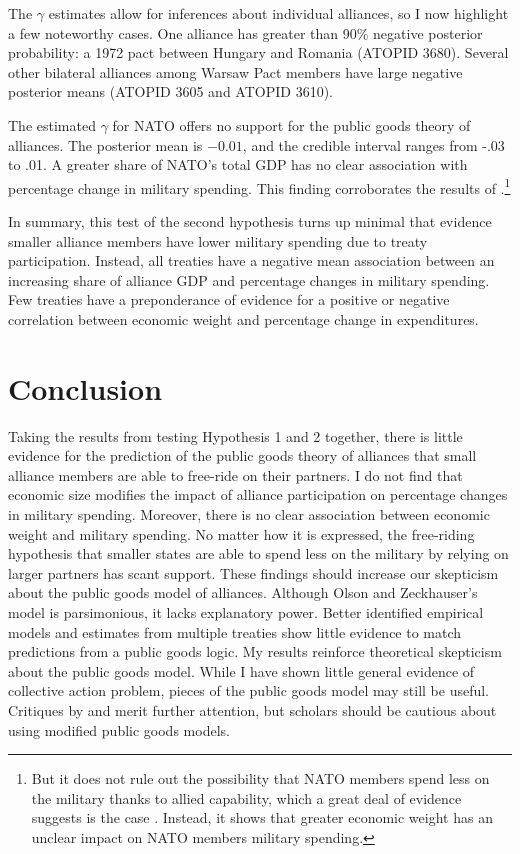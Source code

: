 \documentclass[12pt]{article}
\begin{document}
The $\gamma$ estimates allow for inferences about individual alliances, so I now highlight a few noteworthy cases. 
One alliance has greater than 90\% negative posterior probability: a 1972 pact between Hungary and Romania (ATOPID 3680). 
Several other bilateral alliances among Warsaw Pact members have large negative posterior means (ATOPID 3605 and ATOPID 3610). 

 
The estimated $\gamma$ for NATO offers no support for the public goods theory of alliances. 
The posterior mean is $-0.01$, and the credible interval ranges from -.03 to .01.  
A greater share of NATO's total GDP has no clear association with percentage change in military spending. 
This finding corroborates the results of \citet{PluemperNeumayer2015}.\footnote{But it does not rule out the possibility that NATO members spend less on the military thanks to allied capability, which a great deal of evidence suggests is the case \citep{GeorgeSandler2017}. Instead, it shows that greater economic weight has an unclear impact on NATO members military spending.}


In summary, this test of the second hypothesis turns up minimal that evidence smaller alliance members have lower military spending due to treaty participation. 
Instead, all treaties have a negative mean association between an increasing share of alliance GDP and percentage changes in military spending. 
Few treaties have a preponderance of evidence for a positive or negative correlation between economic weight and percentage change in expenditures.   


\section{Conclusion}

Taking the results from testing Hypothesis 1 and 2 together, there is little evidence for the prediction of the public goods theory of alliances that small alliance members are able to free-ride on their partners. 
I do not find that economic size modifies the impact of alliance participation on percentage changes in military spending.
Moreover, there is no clear association between economic weight and military spending. 
No matter how it is expressed, the free-riding hypothesis that smaller states are able to spend less on the military by relying on larger partners has scant support. 
These findings should increase our skepticism about the public goods model of alliances. 
Although Olson and Zeckhauser's model is parsimonious, it lacks explanatory power. 
Better identified empirical models and estimates from multiple treaties show little evidence to match predictions from a public goods logic. 
My results reinforce theoretical skepticism about the public goods model. 
While I have shown little general evidence of collective action problem, pieces of the public goods model may still be useful. 
Critiques by \citet{Palmer1990} and \citet{SandlerHartley2001} merit further attention, but scholars should be cautious about using modified public goods models. 
\end{document}
